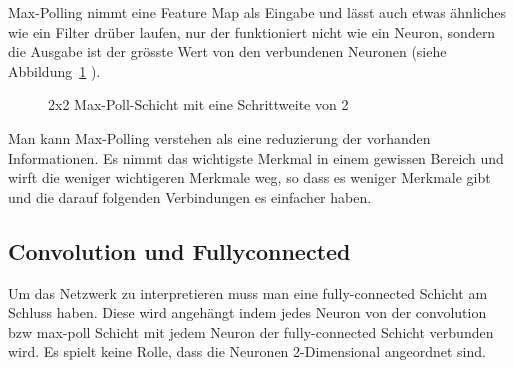 \documentclass[12pt,a4paper]{report}
\begin{document}
Max-Polling nimmt eine Feature Map als Eingabe und lässt auch etwas ähnliches wie ein Filter drüber laufen,
nur der funktioniert nicht wie ein Neuron, sondern die Ausgabe ist der grösste Wert von den verbundenen Neuronen (siehe Abbildung~\ref{fig:pool1} ).
\begin{figure}[h]
    \centering
    \caption{2x2 Max-Poll-Schicht mit eine Schrittweite von 2}
    \label{fig:pool1}
\end{figure}
Man kann Max-Polling verstehen als eine reduzierung der vorhanden Informationen.
Es nimmt das wichtigste Merkmal in einem gewissen Bereich und wirft die weniger wichtigeren Merkmale weg,
so dass es weniger Merkmale gibt und die darauf folgenden Verbindungen es einfacher haben.

\subsection{Convolution und Fullyconnected}
Um das Netzwerk zu interpretieren muss man eine fully-connected Schicht am Schluss haben.
Diese wird angehängt indem jedes Neuron von der convolution bzw max-poll Schicht mit jedem Neuron der fully-connected Schicht verbunden wird.
Es spielt keine Rolle, dass die Neuronen 2-Dimensional angeordnet sind.
\end{document}
